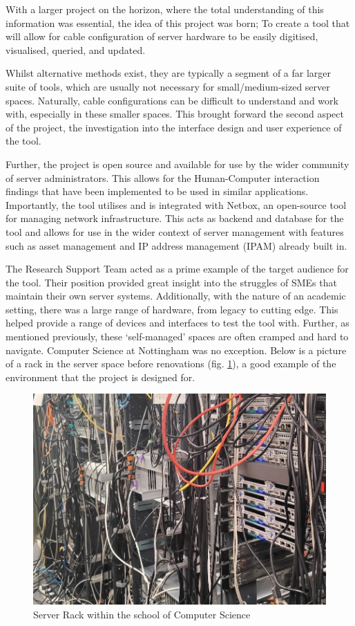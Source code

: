 \documentclass [11pt,a4paper]{article}
\begin{document}
With a larger project on the horizon, where the total understanding of this information was essential, the idea of this project was born; To create a tool that will allow for cable configuration of server hardware to be easily digitised, visualised, queried, and updated.

Whilst alternative methods exist, they are typically a segment of a far larger suite of tools, which are usually not necessary for small/medium-sized server spaces. Naturally, cable configurations can be difficult to understand and work with, especially in these smaller spaces. This brought forward the second aspect of the project, the investigation into the interface design and user experience of the tool. 

Further, the project is open source and available for use by the wider community of server administrators. This  allows for the Human-Computer interaction findings that have been implemented to be used in similar applications. Importantly, the tool utilises and is integrated with Netbox\cite{Netbox}, an open-source tool for managing network infrastructure. This acts as backend and database for the tool and allows for use in the wider context of server management with features such as asset management and IP address management (IPAM) already built in.

The Research Support Team acted as a prime example of the target audience for the tool. Their position provided great insight into the struggles of SMEs that maintain their own server systems. Additionally, with the nature of an academic setting, there was a large range of hardware, from legacy to cutting edge. This helped provide a range of devices and interfaces to test the tool with. Further, as mentioned previously, these `self-managed' spaces are often cramped and hard to navigate. Computer Science at Nottingham was no exception. Below is a picture of a rack in the server space before renovations (fig. \ref{fig:server_rack}), a good example of the environment that the project is designed for.

\begin{figure}[H]
    \centering
    \includegraphics[width=0.40\linewidth]{images/server_racks.jpg}
    \caption{Server Rack within the school of Computer Science}
    \label{fig:server_rack}
\end{figure}
\end{document}
